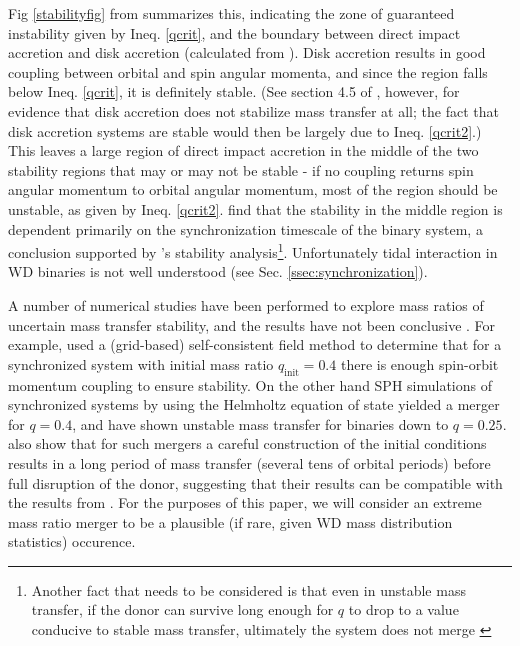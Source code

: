 \noindent Fig \ref{stabilityfig} from \cite{dan+11} summarizes this, indicating the zone of guaranteed instability given by Ineq. \ref{qcrit}, and the boundary between direct impact accretion and disk accretion (calculated from \cite{nele+01}).  Disk accretion results in good coupling between orbital and spin angular momenta, and since the region falls below Ineq. \ref{qcrit}, it is definitely stable.  (See section 4.5 of \citeauthor{marsns04}, however, for evidence that disk accretion does not stabilize mass transfer at all; the fact that disk accretion systems are stable would then be largely due to Ineq. \ref{qcrit2}.)  This leaves a large region of direct impact accretion in the middle of the two stability regions that may or may not be stable - if no coupling returns spin angular momentum to orbital angular momentum, most of the region should be unstable, as given by Ineq. \ref{qcrit2}.  \cite{marsns04} find that the stability in the middle region is dependent primarily on the synchronization timescale of the binary system, a conclusion supported by \cite{gokhpf07}'s stability analysis\footnote{Another fact that needs to be considered is that even in unstable mass transfer, if the donor can survive long enough for $q$ to drop to a value conducive to stable mass transfer, ultimately the system does not merge \citep{gokhpf07}}.  Unfortunately tidal interaction in WD binaries is not well understood (see Sec. \ref{ssec:synchronization}).

A number of numerical studies have been performed to explore mass ratios of uncertain mass transfer stability, and the results have not been conclusive \citep{mars11}.  For example, \cite{motl+07} used a (grid-based) self-consistent field method to determine that for a synchronized system with initial mass ratio $q_\mathrm{init} = 0.4$ there is enough spin-orbit momentum coupling to ensure stability.  On the other hand SPH simulations of synchronized systems by \cite{dan+11} using the Helmholtz equation of state yielded a merger for $q = 0.4$, and have shown unstable mass transfer for binaries down to $q = 0.25$.  \citeauthor{dan+11} also show that for such mergers a careful construction of the initial conditions results in a long period of mass transfer (several tens of orbital periods) before full disruption of the donor, suggesting that their results can be compatible with the results from \citep{motl+07}.  For the purposes of this paper, we will consider an extreme mass ratio merger to be a plausible (if rare, given WD mass distribution statistics) occurence.


